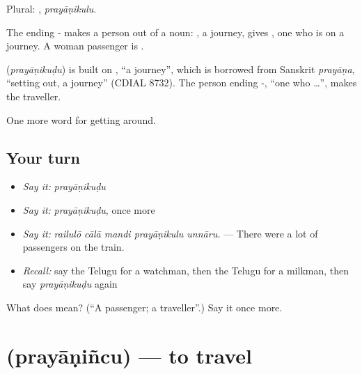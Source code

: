 Plural: , \emph{prayāṇikulu}.

The ending - makes a person out of a noun: , a journey, gives , one who is on a journey. A woman passenger is .

\begin{cousinweb}
\textbf{} (\emph{prayāṇikuḍu}) is built on , \textquotedblleft{}a journey\textquotedblright{}, which is borrowed from Sanskrit \emph{prayāṇa}, \textquotedblleft{}setting out, a journey\textquotedblright{} (CDIAL 8732). The person ending -, \textquotedblleft{}one who …\textquotedblright{}, makes the traveller.
\end{cousinweb}

\begin{grammarlens}[title={What you've built}]
One more word for getting around.
\end{grammarlens}

\subsection*{Your turn}
\begin{itemize}
\raggedright
  \item \emph{Say it:} \emph{prayāṇikuḍu}
  \item \emph{Say it:} \emph{prayāṇikuḍu}, once more
  \item \emph{Say it:} \emph{railulō cālā mandi prayāṇikulu unnāru.} — There were a lot of passengers on the train.
  \item \emph{Recall:} say the Telugu for a watchman, then the Telugu for a milkman, then say \emph{prayāṇikuḍu} again
\end{itemize}

\begin{tcolorbox}[breakable,colback=teal!4,colframe=teal!35!black,title={Before you move on}]
What does  mean? (\textquotedblleft{}A passenger; a traveller\textquotedblright{}.) Say it once more.
\end{tcolorbox}
\section[\texorpdfstring{\te{ప్రయాణించు} (prayāṇiñcu)}{ప్రయాణించు (prayāṇiñcu)}]{ (prayāṇiñcu) — to travel}

\label{lesson:TE-C438-prayanincu}



